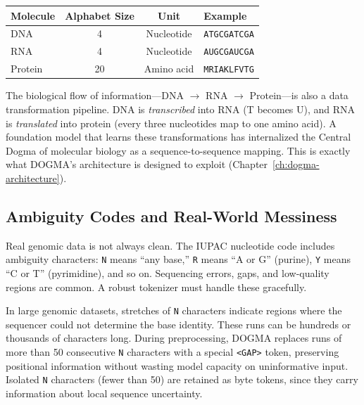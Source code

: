 \begin{center}
\renewcommand{\arraystretch}{1.15}
\begin{tabularx}{0.90\textwidth}{l c c Y}
\toprule
\textbf{Molecule} & \textbf{Alphabet Size} & \textbf{Unit} & \textbf{Example} \\
\midrule
DNA & 4 & Nucleotide & \texttt{ATGCGATCGA} \\
RNA & 4 & Nucleotide & \texttt{AUGCGAUCGA} \\
Protein & 20 & Amino acid & \texttt{MRIAKLFVTG} \\
\bottomrule
\end{tabularx}
\end{center}

\begin{bioinsight}
The biological flow of information---DNA $\to$ RNA $\to$ Protein---is also a data transformation pipeline. DNA is \emph{transcribed} into RNA (T becomes U), and RNA is \emph{translated} into protein (every three nucleotides map to one amino acid). A foundation model that learns these transformations has internalized the Central Dogma of molecular biology as a sequence-to-sequence mapping. This is exactly what DOGMA's architecture is designed to exploit (Chapter~\ref{ch:dogma-architecture}).
\end{bioinsight}

\subsection{Ambiguity Codes and Real-World Messiness}

Real genomic data is not always clean. The IUPAC nucleotide code includes ambiguity characters: \texttt{N} means ``any base,'' \texttt{R} means ``A or G'' (purine), \texttt{Y} means ``C or T'' (pyrimidine), and so on. Sequencing errors, gaps, and low-quality regions are common. A robust tokenizer must handle these gracefully.

\begin{implnote}
In large genomic datasets, stretches of \texttt{N} characters indicate regions where the sequencer could not determine the base identity. These runs can be hundreds or thousands of characters long. During preprocessing, DOGMA replaces runs of more than 50 consecutive \texttt{N} characters with a special \texttt{<GAP>} token, preserving positional information without wasting model capacity on uninformative input. Isolated \texttt{N} characters (fewer than 50) are retained as byte tokens, since they carry information about local sequence uncertainty.
\end{implnote}

